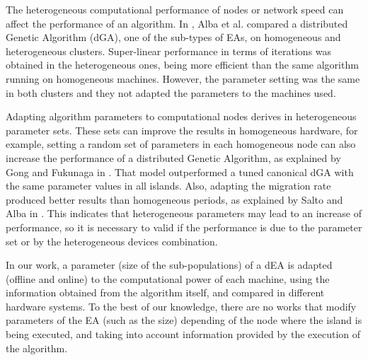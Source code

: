 \documentclass[final,1p,times]{elsarticle}
\begin{document}
The heterogeneous computational performance of nodes or network speed can affect the performance of an algorithm. In \cite{HETEROGENEOUSHARD},
 Alba et al. compared a distributed Genetic Algorithm (dGA), one of
 the sub-types of EAs, on homogeneous and heterogeneous clusters. 
 Super-linear performance in terms of iterations was obtained in the heterogeneous ones,
 being more efficient than the same algorithm running on homogeneous
 machines. However, the parameter setting was the same in both
 clusters and they not adapted the parameters to the machines used. 



Adapting algorithm parameters to computational nodes derives in heterogeneous parameter sets. These sets can improve the results in homogeneous hardware, for example, setting a random set of parameters in each homogeneous node can also increase the
performance of a distributed Genetic Algorithm, as explained by Gong
and Fukunaga in \cite{HETEROGENEOUSPARAMETERS}. That model
outperformed a tuned canonical dGA with the same parameter values in
all islands. Also, adapting the migration rate produced better
results than homogeneous periods, as explained by Salto and Alba in
\cite{HETEROGENEOUSMIGRATION}. This indicates that heterogeneous parameters
 may lead to an increase of performance, so it is necessary to valid if the 
 performance is due to the parameter set or by the heterogeneous devices combination.



In our work, a parameter (size of the sub-populations) of a dEA is adapted (offline and online) to the computational power of each machine, using the information obtained from the algorithm itself, and compared in different hardware systems.
 To the best of our knowledge, there are no works that
 modify parameters of the EA (such as the size) depending of the
 node where the island is being executed, and taking into account information provided by the execution of the algorithm. 


 


\end{document}
